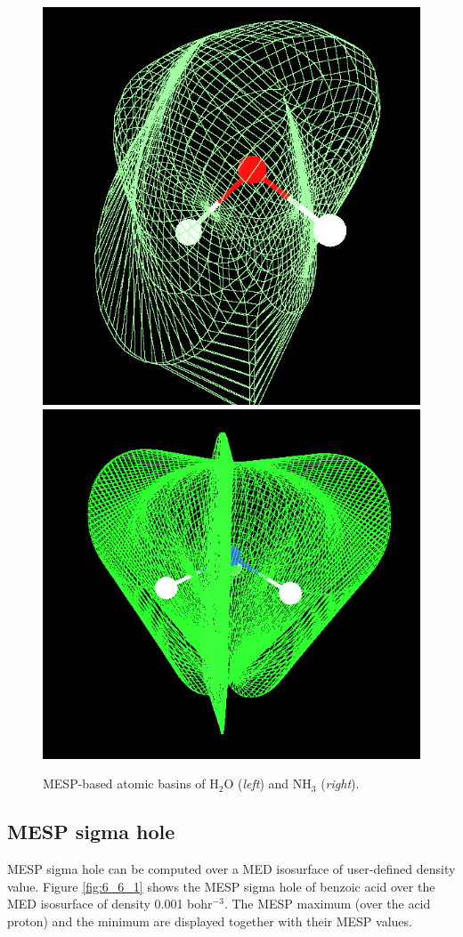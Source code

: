 \documentclass[10pt]{article}
\begin{document}
\begin{figure}[H]
\begin{center}
\vspace*{-3mm}
\includegraphics[width=.30\linewidth]{H2O-bs.jpg}
\hspace*{5mm}
\includegraphics[width=.34\linewidth]{NH3-bs.jpg}
\end{center}
\caption[MESP atomic basins of H$_2$O and NH$_3$]{MESP-based atomic basins of H$_2$O ({\it left}) and NH$_3$ ({\it right}).
\label{fig:6_5_3}}
\end{figure}

\subsection{MESP sigma hole \label{sec:6.6} }

MESP sigma hole can be computed over a MED isosurface of user-defined density value. Figure \ref{fig:6_6_1} shows the
MESP sigma hole of benzoic acid over the MED isosurface of density
0.001 bohr$^{-3}$. The MESP maximum (over the acid proton) and
the minimum are displayed together with their MESP values.
\end{document}
